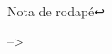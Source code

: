 \documentclass[
]{book}
\begin{document}
\begin{columns}

\begin{column}

\end{column}

\begin{column}

~

\end{column}

\begin{column}

\end{column}

\end{columns}

Nota de rodapé↩︎

--\textgreater{}
\end{document}

